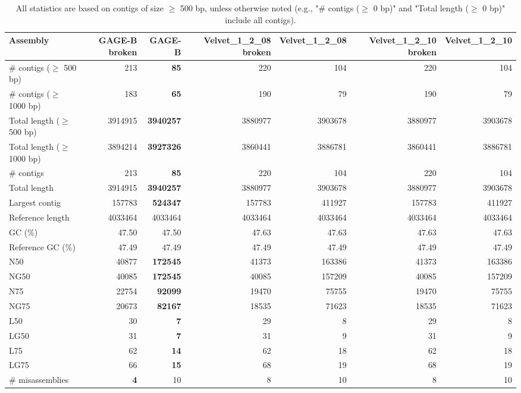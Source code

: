 \documentclass[12pt,a4paper]{article}
\begin{document}
\begin{table}[ht]
\begin{center}
\caption{All statistics are based on contigs of size $\geq$ 500 bp, unless otherwise noted (e.g., "\# contigs ($\geq$ 0 bp)" and "Total length ($\geq$ 0 bp)" include all contigs).}
\begin{tabular}{|l*{6}{|r}|}
\hline
Assembly & GAGE-B broken & GAGE-B & Velvet\_1\_2\_08 broken & Velvet\_1\_2\_08 & Velvet\_1\_2\_10 broken & Velvet\_1\_2\_10 \\ \hline
\# contigs ($\geq$ 500 bp) & 213 & {\bf 85} & 220 & 104 & 220 & 104 \\ \hline
\# contigs ($\geq$ 1000 bp) & 183 & {\bf 65} & 190 & 79 & 190 & 79 \\ \hline
Total length ($\geq$ 500 bp) & 3914915 & {\bf 3940257} & 3880977 & 3903678 & 3880977 & 3903678 \\ \hline
Total length ($\geq$ 1000 bp) & 3894214 & {\bf 3927326} & 3860441 & 3886781 & 3860441 & 3886781 \\ \hline
\# contigs & 213 & {\bf 85} & 220 & 104 & 220 & 104 \\ \hline
Total length & 3914915 & {\bf 3940257} & 3880977 & 3903678 & 3880977 & 3903678 \\ \hline
Largest contig & 157783 & {\bf 524347} & 157783 & 411927 & 157783 & 411927 \\ \hline
Reference length & 4033464 & 4033464 & 4033464 & 4033464 & 4033464 & 4033464 \\ \hline
GC (\%) & 47.50 & 47.50 & 47.63 & 47.63 & 47.63 & 47.63 \\ \hline
Reference GC (\%) & 47.49 & 47.49 & 47.49 & 47.49 & 47.49 & 47.49 \\ \hline
N50 & 40877 & {\bf 172545} & 41373 & 163386 & 41373 & 163386 \\ \hline
NG50 & 40085 & {\bf 172545} & 40085 & 157209 & 40085 & 157209 \\ \hline
N75 & 22754 & {\bf 92099} & 19470 & 75755 & 19470 & 75755 \\ \hline
NG75 & 20673 & {\bf 82167} & 18535 & 71623 & 18535 & 71623 \\ \hline
L50 & 30 & {\bf 7} & 29 & 8 & 29 & 8 \\ \hline
LG50 & 31 & {\bf 7} & 31 & 9 & 31 & 9 \\ \hline
L75 & 62 & {\bf 14} & 62 & 18 & 62 & 18 \\ \hline
LG75 & 66 & {\bf 15} & 68 & 19 & 68 & 19 \\ \hline
\# misassemblies & {\bf 4} & 10 & 8 & 10 & 8 & 10 \\ \hline

\end{tabular}
\end{center}
\end{table}
\end{document}
